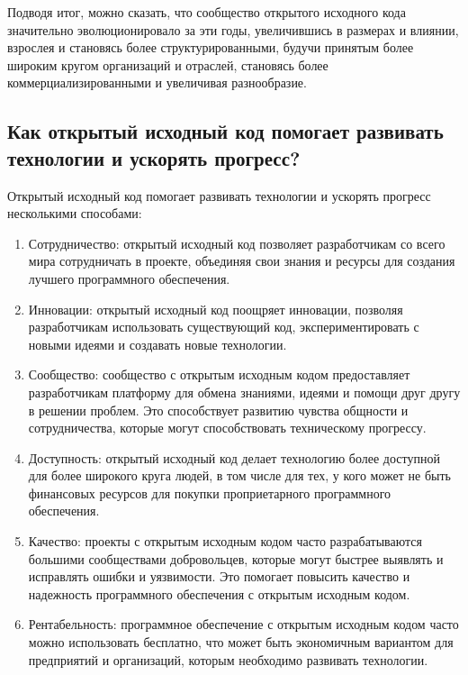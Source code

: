 \documentclass[letterpaper,10pt,russian]{sphinxmanual}
\begin{document}
\sphinxAtStartPar
Подводя итог, можно сказать, что сообщество открытого исходного кода значительно эволюционировало за эти годы, увеличившись в размерах и влиянии, взрослея и становясь более структурированными, будучи принятым более широким кругом организаций и отраслей, становясь более коммерциализированными и увеличивая разнообразие.


\subsection{Как открытый исходный код помогает развивать технологии и ускорять прогресс?}
\label{\detokenize{educational_materials/open_source/content:id3}}
\sphinxAtStartPar
Открытый исходный код помогает развивать технологии и ускорять прогресс несколькими способами:
\begin{enumerate}
%
\item {} 
\sphinxAtStartPar
Сотрудничество: открытый исходный код позволяет разработчикам со всего мира сотрудничать в проекте, объединяя свои знания и ресурсы для создания лучшего программного обеспечения.

\item {} 
\sphinxAtStartPar
Инновации: открытый исходный код поощряет инновации, позволяя разработчикам использовать существующий код, экспериментировать с новыми идеями и создавать новые технологии.

\item {} 
\sphinxAtStartPar
Сообщество: сообщество с открытым исходным кодом предоставляет разработчикам платформу для обмена знаниями, идеями и помощи друг другу в решении проблем. Это способствует развитию чувства общности и сотрудничества, которые могут способствовать техническому прогрессу.

\item {} 
\sphinxAtStartPar
Доступность: открытый исходный код делает технологию более доступной для более широкого круга людей, в том числе для тех, у кого может не быть финансовых ресурсов для покупки проприетарного программного обеспечения.

\item {} 
\sphinxAtStartPar
Качество: проекты с открытым исходным кодом часто разрабатываются большими сообществами добровольцев, которые могут быстрее выявлять и исправлять ошибки и уязвимости. Это помогает повысить качество и надежность программного обеспечения с открытым исходным кодом.

\item {} 
\sphinxAtStartPar
Рентабельность: программное обеспечение с открытым исходным кодом часто можно использовать бесплатно, что может быть экономичным вариантом для предприятий и организаций, которым необходимо развивать технологии.

\end{enumerate}
\end{document}
